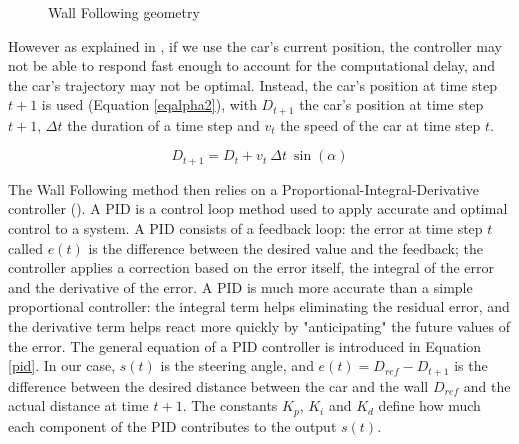 \begin{figure}[H]
\caption{Wall Following geometry}
\label{walllidar}
\end{figure}

However as explained in \cite{wallfollowcourse}, if we use the car's current position, the controller may not be able to respond fast enough to account for the computational delay, and the car's trajectory may not be optimal. Instead, the car's position at time step $t+1$ is used (Equation \ref{eqalpha2}), with $D_{t+1}$ the car's position at time step $t+1$, $\Delta t $ the duration of a time step and $v_t$ the speed of the car at time step $t$.
 
 \begin{equation}
 \label{eqalpha2}
  D_{t+1} = D_t + v_t \: \Delta t \: \sin(\alpha)
 \end{equation}

The Wall Following method then relies on a Proportional-Integral-Derivative controller (\cite{rivera1986internal}). A PID is a control loop method used to apply accurate and optimal control to a system. A PID consists of a feedback loop: the error at time step $t$ called $e(t)$ is the difference between the desired value and the feedback; the controller applies a correction based on the error itself, the integral of the error and the derivative of the error. A PID is much more accurate than a simple proportional controller: the integral term helps eliminating the residual error, and the derivative term helps react more quickly by "anticipating" the future values of the error. \newline
The general equation of a PID controller is introduced in Equation \ref{pid}. In our case, $s(t)$ is the steering angle, and $e(t) = D_{ref} - D_{t+1} $ is the difference between the desired distance between the car and the wall $D_{ref}$ and the actual distance at time $t+1$. The constants $K_p$, $K_i$ and $K_d$ define how much each component of the PID contributes to the output $s(t)$. 

